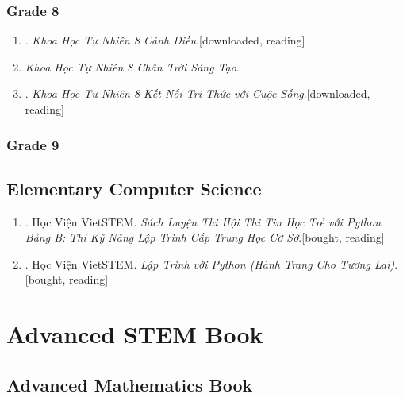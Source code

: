 \documentclass{article}
\begin{document}
\subsubsection{Grade 8}

\begin{enumerate}
	\item \cite{SGK_KHTN_8_Canh_Dieu}. \textit{Khoa Học Tự Nhiên 8 Cánh Diều}.\hfill\textsf{[downloaded, reading]}
	\item \textit{Khoa Học Tự Nhiên 8 Chân Trời Sáng Tạo}.
	\item \cite{SGK_KHTN_8_KNTTVCS}. \textit{Khoa Học Tự Nhiên 8 Kết Nối Tri Thức với Cuộc Sống}.\hfill\textsf{[downloaded, reading]}
\end{enumerate}

\subsubsection{Grade 9}

\subsection{Elementary Computer Science}

\begin{enumerate}
	\item \cite{VietSTEM2021}. Học Viện VietSTEM. \textit{Sách Luyện Thi Hội Thi Tin Học Trẻ  với Python Bảng B: Thi Kỹ Năng Lập Trình Cấp Trung Học Cơ Sở}.\hfill\textsf{[bought, reading]}
	\item \cite{VietSTEM2022}. Học Viện VietSTEM. \textit{Lập Trình với Python (Hành Trang Cho Tương Lai)}.\hfill\textsf{[bought, reading]}
\end{enumerate}


\section{Advanced STEM Book}

\subsection{Advanced Mathematics Book}
\end{document}
